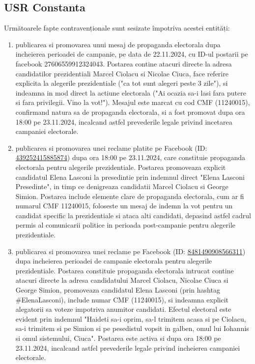 \documentclass[a4paper,12pt]{article}
\begin{document}
\vspace{0.5cm}

\subsection{USR Constanta}
Următoarele fapte contravenționale sunt sesizate împotriva acestei entități:

\begin{enumerate}[leftmargin=*, label=\arabic*.)]
    \item publicarea si promovarea unui mesaj de propaganda electorala dupa incheierea perioadei de campanie, pe data de 22.11.2024, cu ID-ul postarii pe facebook 27606559912324043. Postarea contine atacuri directe la adresa candidatilor prezidentiali Marcel Ciolacu si Nicolae Ciuca, face referire explicita la alegerile prezidentiale ("ca tot sunt alegeri peste 3 zile"), si indeamna in mod direct la actiune electorala ("Ai ocazia sa-i lasi fara putere si fara privilegii. Vino la vot!"). Mesajul este marcat cu cod CMF (11240015), confirmand natura sa de propaganda electorala, si a fost promovat dupa ora 18:00 pe 23.11.2024, incalcand astfel prevederile legale privind incetarea campaniei electorale.
    \item publicarea si promovarea unei reclame platite pe Facebook (ID: \href{https://www.facebook.com/ads/library/?id=439252415885874}{439252415885874}) dupa ora 18:00 pe 23.11.2024, care constituie propaganda electorala pentru alegerile prezidentiale. Postarea promoveaza explicit candidatul Elena Lasconi la presedintie prin indemnul direct "Elena Lasconi Presedinte", in timp ce denigreaza candidatii Marcel Ciolacu si George Simion. Postarea include elemente clare de propaganda electorala, cum ar fi numarul CMF 11240015, foloseste un mesaj de indemn la vot pentru un candidat specific la prezidentiale si ataca alti candidati, depasind astfel cadrul permis al comunicarii politice in perioada post-campanie pentru alegerile prezidentiale.
    \item publicarea si promovarea unei reclame pe Facebook (ID: \href{https://www.facebook.com/ads/library/?id=8481490908566311}{8481490908566311}) dupa incheierea perioadei de campanie electorala pentru alegerile prezidentiale. Postarea constituie propaganda electorala intrucat contine atacuri directe la adresa candidatului Marcel Ciolacu, Nicolae Ciuca si George Simion, promoveaza candidatul Elena Lasconi (prin hashtag \#ElenaLasconi), include numar CMF (11240015), si indeamna explicit alegatorii sa voteze impotriva anumitor candidati. Efectul electoral este evident prin indemnul "Haideti sa-i oprim, sa-l trimitem acasa si pe Ciolacu, sa-i trimitem si pe Simion si pe pesedistul vopsit in galben, omul lui Iohannis si omul sistemului, Ciuca". Postarea este activa si dupa ora 18:00 pe 23.11.2024, incalcand astfel prevederile legale privind incheierea campaniei electorale.

\end{enumerate}
\end{document}
